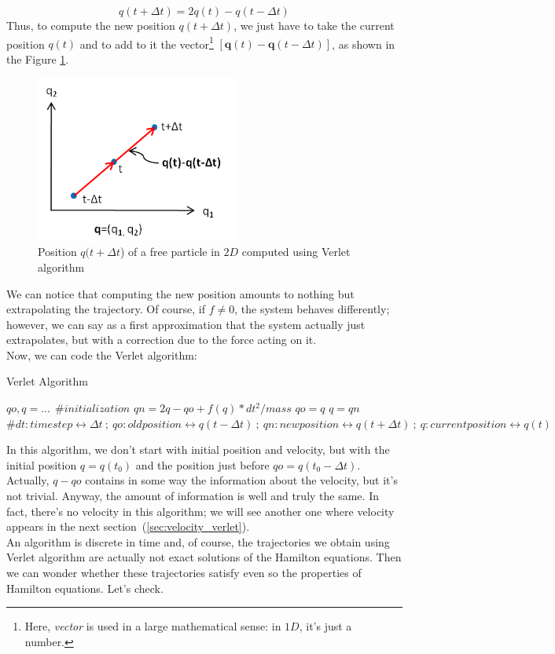     \begin{equation}
        q(t+\Delta t)=2q(t)-q(t-\Delta t)
    \end{equation}
    Thus, to compute the new position $q(t+\Delta t)$, we just have to take the current position $q(t)$ and to add to it the vector\footnote{Here, \textit{vector} is used in a large mathematical sense: in $1D$, it's just a number.} $[\mathbf{q}(t)-\mathbf{q}(t-\Delta t)]$, as shown in the Figure \ref{fig:verlet_freepart}.
    \begin{figure}[H]
        \centering
        \includegraphics[width=0.6\textwidth]{Integrators/images/verlet_freepart.png}
        \caption{Position $q(t+\Delta t$) of a free particle in $2D$ computed using Verlet algorithm}
        \label{fig:verlet_freepart}
    \end{figure}
    \noindent We can notice that computing the new position amounts to nothing but extrapolating the trajectory. Of course, if $f\neq 0$, the system behaves differently; however, we can say as a first approximation that the system actually just extrapolates, but with a correction due to the force acting on it.
    \\Now, we can code the Verlet algorithm:
    \begin{algorithm}[H]
		\caption{Verlet Algorithm}
        \label{alg:verlet}
		\begin{algorithmic}[1]
		    \State $qo,q=...~~\#initialization$ 
			\State $qn=2q-qo+f(q)*dt^2/mass$ 
			\State $qo=q$
			\State $q=qn$
			\EndFor
			\State $\# dt: time step\leftrightarrow \Delta t~;~qo: old position\leftrightarrow q(t-\Delta t)~;~qn: new position\leftrightarrow q(t+\Delta t)~;~q: current position\leftrightarrow q(t)$
		\end{algorithmic}
	\end{algorithm}
	\noindent In this algorithm, we don't start with initial position and velocity, but with the initial position $q=q(t_0)$ and the position just before $qo=q(t_0-\Delta t)$. Actually, $q-qo$ contains in some way the information about the velocity, but it's not trivial. Anyway, the amount of information is well and truly the same. In fact, there's no velocity in this algorithm; we will see another one where velocity appears in the next section~(\ref{sec:velocity_verlet}).
	\\An algorithm is discrete in time and, of course, the trajectories we obtain using Verlet algorithm are actually not exact solutions of the Hamilton equations. Then we can wonder whether these trajectories satisfy even so the properties of Hamilton equations. Let's check.
	
